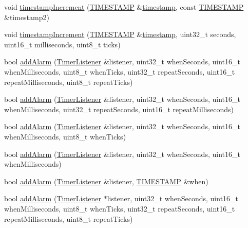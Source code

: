 \begin{DoxyCompactItemize}
void \hyperlink{classflame_1_1_r_t_c_ac9e327bd6696dab66fae72cca5676b11}{timestamp\-Increment} (\hyperlink{namespaceflame_ad90347e9ea7e54907966260ec5c7d22f}{T\-I\-M\-E\-S\-T\-A\-M\-P} \&\hyperlink{structflame_1_1timestamp}{timestamp}, const \hyperlink{namespaceflame_ad90347e9ea7e54907966260ec5c7d22f}{T\-I\-M\-E\-S\-T\-A\-M\-P} \&timestamp2)
\item 
void \hyperlink{classflame_1_1_r_t_c_a68603e274c5c12bdbeafeab6323465fb}{timestamp\-Increment} (\hyperlink{namespaceflame_ad90347e9ea7e54907966260ec5c7d22f}{T\-I\-M\-E\-S\-T\-A\-M\-P} \&\hyperlink{structflame_1_1timestamp}{timestamp}, uint32\-\_\-t seconds, uint16\-\_\-t milliseconds, uint8\-\_\-t ticks)
\item 
bool \hyperlink{classflame_1_1_r_t_c_a6398e8a4677ae1a59854a01f2c1ec5e4}{add\-Alarm} (\hyperlink{classflame_1_1_timer_listener}{Timer\-Listener} \&listener, uint32\-\_\-t when\-Seconds, uint16\-\_\-t when\-Milliseconds, uint8\-\_\-t when\-Ticks, uint32\-\_\-t repeat\-Seconds, uint16\-\_\-t repeat\-Milliseconds, uint8\-\_\-t repeat\-Ticks)
\item 
bool \hyperlink{classflame_1_1_r_t_c_aa53710bf71cd287d051e104a7edba27c}{add\-Alarm} (\hyperlink{classflame_1_1_timer_listener}{Timer\-Listener} \&listener, uint32\-\_\-t when\-Seconds, uint16\-\_\-t when\-Milliseconds, uint32\-\_\-t repeat\-Seconds, uint16\-\_\-t repeat\-Milliseconds)
\item 
bool \hyperlink{classflame_1_1_r_t_c_a8681ff7b542f02c8a21f1e8dbb2b0034}{add\-Alarm} (\hyperlink{classflame_1_1_timer_listener}{Timer\-Listener} \&listener, uint32\-\_\-t when\-Seconds, uint16\-\_\-t when\-Milliseconds, uint8\-\_\-t when\-Ticks)
\item 
bool \hyperlink{classflame_1_1_r_t_c_a775dfd649ec2ce41c0f64708b32f18c3}{add\-Alarm} (\hyperlink{classflame_1_1_timer_listener}{Timer\-Listener} \&listener, uint32\-\_\-t when\-Seconds, uint16\-\_\-t when\-Milliseconds)
\item 
bool \hyperlink{classflame_1_1_r_t_c_a9e5862b3c4037fb44172e2194ffdc263}{add\-Alarm} (\hyperlink{classflame_1_1_timer_listener}{Timer\-Listener} \&listener, \hyperlink{namespaceflame_ad90347e9ea7e54907966260ec5c7d22f}{T\-I\-M\-E\-S\-T\-A\-M\-P} \&when)
\item 
bool \hyperlink{classflame_1_1_r_t_c_affcf2d298d1e96c543d508a48c7e65bb}{add\-Alarm} (\hyperlink{classflame_1_1_timer_listener}{Timer\-Listener} $\ast$listener, uint32\-\_\-t when\-Seconds, uint16\-\_\-t when\-Milliseconds, uint8\-\_\-t when\-Ticks, uint32\-\_\-t repeat\-Seconds, uint16\-\_\-t repeat\-Milliseconds, uint8\-\_\-t repeat\-Ticks)

\end{DoxyCompactItemize}

